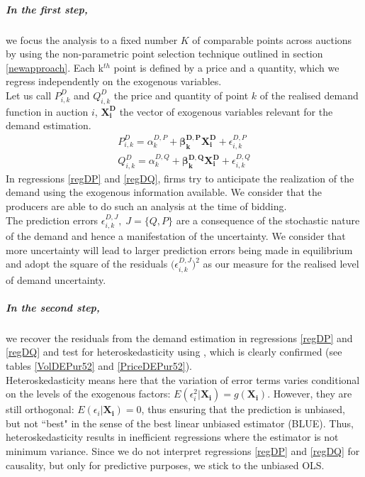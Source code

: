 \subparagraph{In the first step,} 
\label{firststepresiduals}
we focus the analysis to a fixed number $K$ of comparable points across auctions by using the non-parametric point selection technique outlined in section \ref{newapproach}. Each k$^{th}$ point is defined by a price and a quantity, which we regress independently on the exogenous variables. \\

Let us call $P_{i,k}^D$ and $Q_{i,k}^D$ the price and quantity of point $k$ of the realised demand function in auction $i$, $\boldsymbol{X^D_i}$ the vector of exogenous variables relevant for the demand estimation.
\begin{eqnarray}
P_{i,k}^D=\alpha_{k}^{D,P}+{\boldsymbol{\beta_{k}^{D,P}}} \boldsymbol{X^D_i}+\epsilon_{i,k}^{D,P} \label{regDP}\\
Q_{i,k}^D=\alpha_{k}^{D,Q}+{\boldsymbol{\beta_{k}^{D,Q}}} \boldsymbol{X^D_i}+\epsilon_{i,k}^{D,Q} \label{regDQ}
\end{eqnarray}
In regressions \ref{regDP} and \ref{regDQ}, firms try to anticipate the realization of the demand using the exogenous information available. We consider that the producers are able to do such an analysis at the time of bidding. \\

The prediction errors  $\epsilon_{i,k}^{D,J}, \; J=\{Q, P\}$ are a consequence of the stochastic nature of the demand and hence a manifestation of the uncertainty. We consider that more uncertainty will lead to larger prediction errors being made in equilibrium and adopt the square of the residuals $ \bigl( \epsilon_{i,k}^{D,J} \bigr)^2$ as our measure for the realised level of demand uncertainty.

\subparagraph{In the second step,} 
\label{secondstepresiduals}
we recover the residuals from the demand estimation in regressions \ref{regDP} and \ref{regDQ} and test for heteroskedasticity using \cite{white1980heteroskedasticity}, which is clearly confirmed (see tables \ref{VolDEPur52} and \ref{PriceDEPur52}). \\

Heteroskedasticity means here that the variation of error terms varies conditional on the levels of the exogenous factors: $E(\epsilon_i^2 \vert \boldsymbol{X_i})=g(\boldsymbol{X_i})$. However, they are still orthogonal: $E(\epsilon_i \vert \boldsymbol{X_i})=0$, thus ensuring that the prediction is unbiased, but not ``best" in the sense of the best linear unbiased estimator (BLUE). Thus, heteroskedasticity results in inefficient regressions where the estimator is not minimum variance. Since we do not interpret regressions \ref{regDP} and \ref{regDQ} for causality, but only for predictive purposes, we stick to the unbiased OLS. \\

